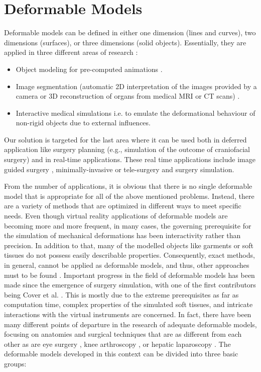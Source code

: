 \section{Deformable Models}
Deformable models can be defined in either one dimension (lines and curves), two dimensions (surfaces), or three dimensions (solid objects). 
Essentially, they are applied in three different areas of research \cite{Meier2005}: 

\begin{itemize}
 \item Object modeling for pre-computed animations \cite{coquillart1990extended, hsu1992direct}.
 \item Image segmentation (automatic 2D interpretation of the images provided by a camera or 3D reconstruction of organs from medical MRI 
 or CT scans) \cite{neveu1994recovery}.
 \item Interactive medical simulations i.e. to emulate the deformational behaviour of non-rigid objects due to external influences.
\end{itemize}

Our solution is targeted for the last area where it can be used both in deferred application like surgery planning (e.g., simulation of the 
outcome of craniofacial surgery) \cite{bro1995modelling, keeve1996craniofacial} and in real-time applications. These real time applications 
include image guided surgery \cite{Szekely2000}, minimally-invasive or tele-surgery and surgery simulation. 

From the number of applications, it is obvious that there is no single deformable model that is appropriate for all of the above mentioned 
problems. Instead, there are a variety of methods that are optimized in different ways to meet specific needs. Even though virtual reality 
applications of deformable models are becoming more and more frequent, in many cases, the governing prerequisite for the simulation of 
mechanical deformations has been interactivity rather than precision. In addition to that, many of the modelled objects like garments or soft 
tissues do not possess easily describable properties. Consequently, exact methods, in general, cannot be applied as deformable models, and thus, 
other approaches must to be found \cite{bro1998finite}. Important progress in the field of deformable models has been made since the emergence of surgery 
simulation, with one of the first contributors being Cover et al. \cite{cover1993interactively}. This is mostly due to the extreme prerequisites 
as far as computation time, complex properties of the simulated soft tissues, and intricate interactions with the virtual instruments are concerned. 
In fact, there have been many different points of departure in the research of adequate deformable models, focusing on anatomies and surgical techniques 
that are as different from each other as are eye surgery \cite{cai2001parametric, sagar1994virtual}, knee arthroscopy \cite{gibson1997simulating, 
hoffman1998commercially}, or hepatic laparoscopy \cite{cotin1999real}. The deformable models developed in this context can be divided into three basic groups: 

